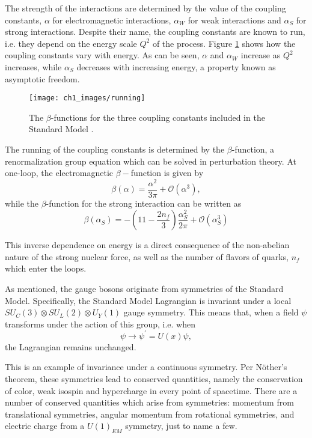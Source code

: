 \documentclass[10pt,a4paper]{book}
\begin{document}
The strength of the interactions are determined by the value of the coupling constants, $\alpha$ for electromagnetic interactions, $\alpha_W$ for weak interactions and $\alpha_S$ for strong interactions. Despite their name, the coupling constants are known to run, i.e. they depend on the energy scale $Q^2$ of the process. Figure \ref{running coupling constants} shows how the coupling constants vary with energy. As can be seen, $\alpha$ and $\alpha_W$ increase as $Q^2$ increases, while $\alpha_S$ decreases with increasing energy, a property known as asymptotic freedom. 

\begin{figure}
\centering
\texttt{[image: ch1\_images/running]}
\caption{The $\beta$-functions for the three coupling constants included in the Standard Model \cite{wiki:xxx}.}
\label{running coupling constants}
\end{figure}

The running of the coupling constants is determined by the $\beta$-function, a renormalization group equation which can be solved in perturbation theory. At one-loop, the electromagnetic $\beta-$function is given by \cite{pinkbook}
\begin{equation}
\beta(\alpha) = \frac{\alpha^2}{3\pi} + \mathcal{O}(\alpha^3),
\end{equation}
while the $\beta$-function for the strong interaction can be written as
\begin{equation}
\beta(\alpha_S) = -\left(11 - \frac{2n_f}{3} \right)\frac{\alpha_S^2}{2\pi} + \mathcal{O}(\alpha_S^3)
\end{equation}

This inverse dependence on energy is a direct consequence of the non-abelian nature of the strong nuclear force, as well as the number of flavors of quarks, $n_f$ which enter the loops.  

As mentioned, the gauge bosons originate from symmetries of the Standard Model. Specifically, the Standard Model Lagrangian is invariant under a local $SU_C(3) \otimes SU_L(2) \otimes U_Y(1)$ gauge symmetry. This means that, when a field $\psi$ transforms under the action of this group, i.e. when
\begin{equation}
\psi \rightarrow \psi^\prime = U(x)\psi,
\end{equation}
the Lagrangian remains unchanged. 

This is an example of invariance under a continuous symmetry. Per N\"{o}ther's theorem, these symmetries lead to conserved quantities, namely the conservation of color, weak isospin and hypercharge in every point of spacetime. There are a number of conserved quantities which arise from symmetries: momentum from translational symmetries, angular momentum from rotational symmetries, and electric charge from a $U(1)_{EM}$ symmetry, just to name a few.
\end{document}
